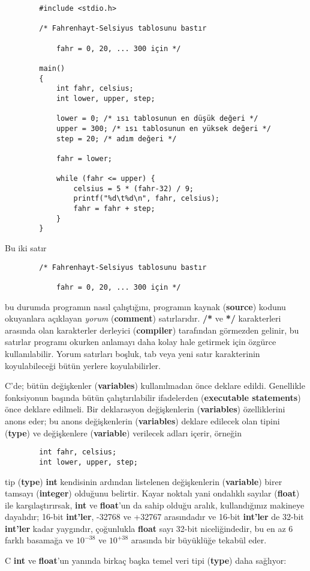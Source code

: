 \documentclass[a4paper,12pt,oneside]{book}
\begin{document}
\begin{lstlisting}
		#include <stdio.h>

		/* Fahrenhayt-Selsiyus tablosunu bastır

			fahr = 0, 20, ... 300 için */

		main()
		{
			int fahr, celsius;
			int lower, upper, step;

			lower = 0; /* ısı tablosunun en düşük değeri */
			upper = 300; /* ısı tablosunun en yüksek değeri */
			step = 20; /* adım değeri */

			fahr = lower;

			while (fahr <= upper) {
				celsius = 5 * (fahr-32) / 9;
				printf("%d\t%d\n", fahr, celsius);
				fahr = fahr + step;
			}
		}
\end{lstlisting}
Bu iki satır \begin{lstlisting}
		/* Fahrenhayt-Selsiyus tablosunu bastır

			fahr = 0, 20, ... 300 için */
\end{lstlisting}
bu durumda programın nasıl çalıştığını, programın kaynak (\textbf{source}) kodunu okuyanlara açıklayan \textit{yorum} (\textbf{comment}) satırlarıdır. \textbf{/*} ve \textbf{*/} karakterleri arasında olan karakterler derleyici (\textbf{compiler}) tarafından görmezden gelinir, bu satırlar programı okurken anlamayı daha kolay hale getirmek için özgürce kullanılabilir. Yorum satırları boşluk, tab veya yeni satır karakterinin koyulabileceği bütün yerlere koyulabilirler.
\par C'de; bütün değişkenler (\textbf{variables}) kullanılmadan önce deklare edildi. Genellikle fonksiyonun  başında bütün çalıştırılabilir ifadelerden (\textbf{executable statements}) önce deklare edilmeli. Bir deklarasyon değişkenlerin (\textbf{variables}) özelliklerini anons eder; bu anons değişkenlerin (\textbf{variables}) deklare edilecek olan tipini (\textbf{type}) ve değişkenlere (\textbf{variable}) verilecek adları içerir, örneğin
\newline
\begin{lstlisting}
		int fahr, celsius;
		int lower, upper, step;
\end{lstlisting}
tip (\textbf{type}) \textbf{int} kendisinin ardından listelenen değişkenlerin (\textbf{variable}) birer tamsayı (\textbf{integer}) olduğunu belirtir. Kayar noktalı yani ondalıklı sayılar (\textbf{float}) ile karşılaştırırsak, \textbf{int} ve \textbf{float}'un da sahip olduğu aralık, kullandığınız makineye dayalıdır; 16-bit \textbf{int'ler}, -32768 ve +32767 arasındadır ve 16-bit \textbf{int'ler} de 32-bit \textbf{int'ler} kadar yaygındır, çoğunlukla \textbf{float} sayı 32-bit niceliğindedir, bu en az 6 farklı basamağa ve $10^{-38}$ ve $10^{+38}$ arasında bir büyüklüğe tekabül eder.
\par C \textbf{int} ve \textbf{float}'un yanında birkaç başka temel veri tipi (\textbf{type}) daha sağlıyor:
\end{document}

